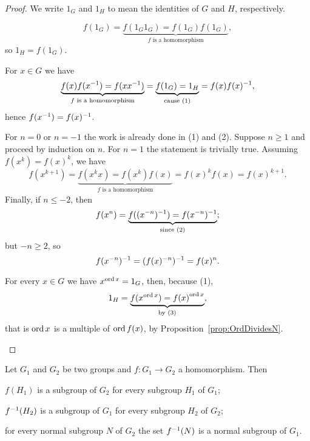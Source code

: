 \begin{proof}
We write \(1_G\) and \(1_H\) to mean the identities of \(G\) and \(H\), respectively.
\begin{tcbenum}
\item \[f(1_G) = \underbrace{f(1_G 1_G) = f(1_G) f(1_G)}_{f \text{ is a homomorphism}},\]
so \(1_H = f(1_G)\).
\item For \(x \in G\) we have 
\[\underbrace{f(x) f(x^{-1}) = f (x x^{-1})}_{f \text{ is a homomorphism}} = \underbrace{f(1_G) = 1_H}_{\text{cause (1)}} = f(x) f(x)^{-1},\]
hence \(f(x^{-1}) = f(x)^{-1}\).
\item For \(n = 0\) or \(n = -1\) the work is already done in (1) and (2). Suppose \(n \ge 1\) and proceed by induction on \(n\). For \(n = 1\) the statement is trivially true. Assuming \(f(x^k) = f(x)^k\), we have
\[f(x^{k+1}) = \underbrace{f(x^kx) = f(x^k)f(x)}_{f \text{ is a homomorphism}} = f(x)^kf(x) = f(x)^{k+1}.\]
Finally, if \(n \le -2\), then
\[f(x^n) = \underbrace{f((x^{-n})^{-1}) = f(x^{-n})^{-1}}_{\text{since (2)}};\]
but \(-n \ge 2\), so
\[f(x^{-n})^{-1} = (f(x)^{-n})^{-1} = f(x)^n .\]
\item For every \(x \in G\) we have \(x^{\operatorname{ord} x} = 1_G\), then, because (1),
\[1_H = \underbrace{f(x^{\operatorname{ord} x}) = {f(x)}^{\operatorname{ord} x}}_{\text{by (3)}},\]
that is \(\operatorname{ord} x\) is a multiple of \(\operatorname{ord} f(x)\), by Proposition~\ref{prop:OrdDividesN}. \qedhere
\end{tcbenum}
\end{proof}

\begin{proposition}\label{prop:SubgroupsToSubgroups}
Let \(G_1\) and \(G_2\) be two groups and \(f : G_1 \to G_2\) a homomorphism. Then
\begin{tcbenum}
\item \(f(H_1)\) is a subgroup of \(G_2\) for every subgroup \(H_1\) of \(G_1\);
\item \(f^{-1}(H_2)\) is a subgroup of \(G_1\) for every subgroup \(H_2\) of \(G_2\);
\item for every normal subgroup \(N\) of \(G_2\) the set \(f^{-1} (N)\) is a normal subgroup of \(G_1\).
\end{tcbenum}
\end{proposition}

